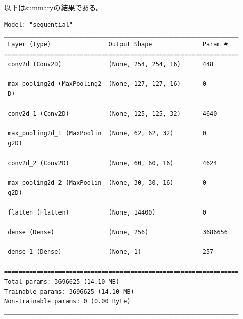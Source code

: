\documentclass[a4paper, 11pt, titlepage]{jsarticle}
\begin{document}
以下はsummaryの結果である。\par
{\fontsize{10pt}{9pt}\selectfont
\begin{verbatim}
Model: "sequential"
_________________________________________________________________
 Layer (type)                Output Shape              Param #   
=================================================================
 conv2d (Conv2D)             (None, 254, 254, 16)      448       
                                                                 
 max_pooling2d (MaxPooling2  (None, 127, 127, 16)      0         
 D)                                                              
                                                                 
 conv2d_1 (Conv2D)           (None, 125, 125, 32)      4640      
                                                                 
 max_pooling2d_1 (MaxPoolin  (None, 62, 62, 32)        0         
 g2D)                                                            
                                                                 
 conv2d_2 (Conv2D)           (None, 60, 60, 16)        4624      
                                                                 
 max_pooling2d_2 (MaxPoolin  (None, 30, 30, 16)        0         
 g2D)                                                            
                                                                 
 flatten (Flatten)           (None, 14400)             0         
                                                                 
 dense (Dense)               (None, 256)               3686656   
                                                                 
 dense_1 (Dense)             (None, 1)                 257       
                                                                 
=================================================================
Total params: 3696625 (14.10 MB)
Trainable params: 3696625 (14.10 MB)
Non-trainable params: 0 (0.00 Byte)
_________________________________________________________________
\end{verbatim}
}
\end{document}
